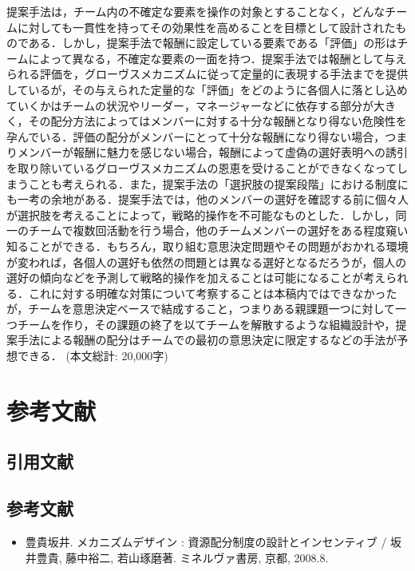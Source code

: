 \documentclass[a4paper, 11pt]{jsarticle}
\begin{document}
提案手法は，チーム内の不確定な要素を操作の対象とすることなく，どんなチームに対しても一貫性を持ってその効果性を高めることを目標として設計されたものである．しかし，提案手法で報酬に設定している要素である「評価」の形はチームによって異なる，不確定な要素の一面を持つ．提案手法では報酬として与えられる評価を，グローヴスメカニズムに従って定量的に表現する手法までを提供しているが，その与えられた定量的な「評価」をどのように各個人に落とし込めていくかはチームの状況やリーダー，マネージャーなどに依存する部分が大きく，その配分方法によってはメンバーに対する十分な報酬となり得ない危険性を孕んでいる．評価の配分がメンバーにとって十分な報酬になり得ない場合，つまりメンバーが報酬に魅力を感じない場合，報酬によって虚偽の選好表明への誘引を取り除いているグローヴスメカニズムの恩恵を受けることができなくなってしまうことも考えられる．また，提案手法の「選択肢の提案段階」における制度にも一考の余地がある．提案手法では，他のメンバーの選好を確認する前に個々人が選択肢を考えることによって，戦略的操作を不可能なものとした．しかし，同一のチームで複数回活動を行う場合，他のチームメンバーの選好をある程度窺い知ることができる．もちろん，取り組む意思決定問題やその問題がおかれる環境が変われば，各個人の選好も依然の問題とは異なる選好となるだろうが，個人の選好の傾向などを予測して戦略的操作を加えることは可能になることが考えられる．これに対する明確な対策について考察することは本稿内ではできなかったが，チームを意思決定ベースで結成すること，つまりある親課題一つに対して一つチームを作り，その課題の終了を以てチームを解散するような組織設計や，提案手法による報酬の配分はチームでの最初の意思決定に限定するなどの手法が予想できる．
 (本文総計: 20,000字) 
\section*{参考文献}
\subsection*{引用文献}
\begingroup
\renewcommand{\section}[2]{}


\endgroup
\subsection*{参考文献}
\begin{itemize}[leftmargin=*]
\item[] 豊貴坂井. メカニズムデザイン : 資源配分制度の設計とインセンティブ / 坂井豊貴, 藤中裕二, 若山琢磨著. ミネルヴァ書房, 京都, 2008.8.
\end{itemize}
\end{document}
